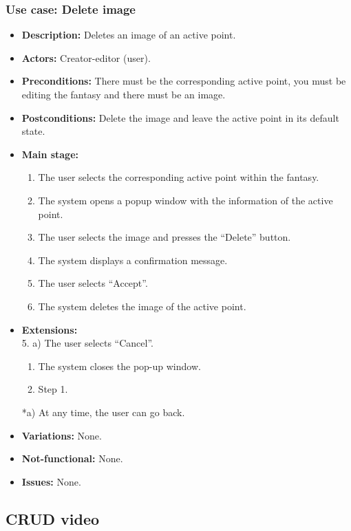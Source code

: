 \subsubsection{Use case: Delete image}
\begin{itemize}
	\item \textbf{Description:} Deletes an image of an active point.
	\item \textbf{Actors:} Creator-editor (user).
	\item \textbf{Preconditions:} There must be the corresponding active point, you must be editing the fantasy and there must be an image.
	\item \textbf{Postconditions:} Delete the image and leave the active point in its default state.
	\item \textbf{Main stage:}
	\begin{enumerate}
		\item The user selects the corresponding active point within the fantasy.
		\item The system opens a popup window with the information of the active point.
		\item The user selects the image and presses the ``Delete'' button.
		\item The system displays a confirmation message.
		\item The user selects ``Accept''.
		\item The system deletes the image of the active point.
	\end{enumerate}
	\item \textbf{Extensions:} \\ 5. a) The user selects ``Cancel''.
	\begin{enumerate}
		\item The system closes the pop-up window.
		\item Step 1.
	\end{enumerate}
	*a) At any time, the user can go back.
	\item \textbf{Variations:} None.
	\item \textbf{Not-functional:} None.
	\item \textbf{Issues:} None.
\end{itemize}

\subsection{CRUD video}
\hypertarget{crearvideo}{}
